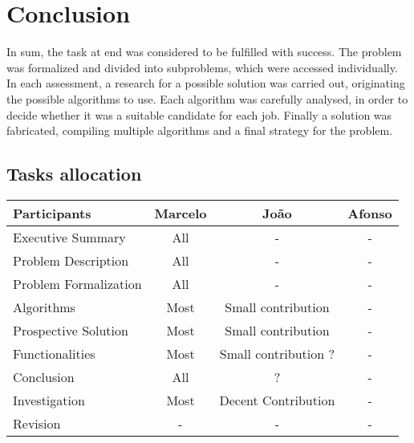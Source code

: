 \chapter{Conclusion}

In sum, the task at end was considered to be fulfilled with success. The problem was formalized and divided into subproblems, which were accessed individually. In each assessment, a research for a possible solution was carried out, originating the possible algorithms to use. Each algorithm was carefully analysed, in order to decide whether it was a suitable candidate for each job. Finally a solution was fabricated, compiling multiple algorithms and a final strategy for the problem.

\section{Tasks allocation}
\begin{center}
    \begin{tabular}{l | c  c  c}
        \textbf{Participants}           & \textbf{Marcelo} & \textbf{João} & \textbf{Afonso} \\ \hline
        Executive Summary                     & All & - & - \\
        Problem Description                   & All & - & -   \\
        Problem Formalization                 & All & - & - \\
        Algorithms                            & Most & Small contribution & -   \\
        Prospective Solution                  & Most & Small contribution & -   \\
        Functionalities                       & Most & Small contribution ? & -   \\
        Conclusion                            & All & ? & -   \\
        Investigation                         & Most & Decent Contribution & - \\
        Revision                              & - & - & - 
    \end{tabular}
\end{center}